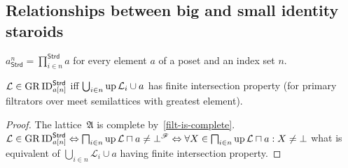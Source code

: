\subsection{Relationships between big and small identity staroids}
\begin{defn}
$a_{\mathsf{Strd}}^{n}=\prod_{i\in n}^{\mathsf{Strd}}a$ for every
element $a$ of a poset and an index set $n$.\end{defn}

\begin{lem}
$\mathcal{L}\in\operatorname{GR}\operatorname{ID}_{a[n]}^{\mathsf{Strd}}$ iff $\bigcup_{i\in n}\operatorname{up}\mathcal{L}_{i}\cup a$
has finite intersection property (for primary filtrators over meet semilattices with greatest element).\end{lem}
\begin{proof}
The lattice~$\mathfrak{A}$ is complete by~\ref{filt-is-complete}.
$\mathcal{L}\in\operatorname{GR}\operatorname{ID}_{a[n]}^{\mathsf{Strd}}\Leftrightarrow\bigsqcap_{i\in n}\operatorname{up}\mathcal{L}\sqcap a\neq\bot^{\mathscr{F}}\Leftrightarrow\forall X\in\bigsqcap_{i\in n}\operatorname{up}\mathcal{L}\sqcap a:X\neq\bot$
what is equivalent of $\bigcup_{i\in n}\mathcal{L}_{i}\cup a$ having
finite intersection property.\end{proof}

